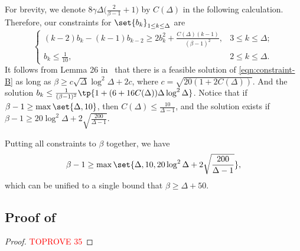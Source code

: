 \documentclass[a4paper,11pt]{article}
\begin{document}
For brevity, we denote ${8\gamma\Delta}\Big(\frac{2}{\beta-1} + 1\Big)$ by $C(\Delta)$ in the following calculation. Therefore, our constraints for $\set{b_k}_{1\leq k\leq \Delta}$ are
\begin{equation}
	\label{eqn:constraint-B}\tag{$\blacktriangle$}
	\begin{cases}
		(k-2) b_k - (k-1)b_{k-2} \ge 2b_k^2+\frac{C(\Delta)(k-1)}{(\beta-1)^2},& 3\le k\le \Delta; \\
		b_k \le \frac1{10}, & 2\le k\le \Delta.
	\end{cases}
\end{equation}
It follows from Lemma 26 in~\cite{WZZ24} that there is a feasible solution of \cref{eqn:constraint-B}
as long as $\beta\ge c\sqrt\Delta\log^2\Delta + 2c$, where $c = \sqrt{20(1+2C(\Delta))}$. And the solution $b_k \leq \frac{1}{(\beta-1)^2}\tp{1+(6+16 C(\Delta))\Delta \log^2 \Delta}$.
Notice that if $\beta - 1\ge \max\set{\Delta, 10}$, then $C(\Delta)\le \frac{10}{\Delta-1}$,
and the solution exists if $\beta - 1\ge 20\log^2\Delta+2\sqrt{\frac{200}{\Delta-1}}$.

Putting all constraints to $\beta$ together, we have
\[\beta-1\ge \max\set{\Delta, 10, 20\log^2\Delta+2\sqrt{\frac{200}{\Delta-1}}},\]
which can be unified to a single bound that $\beta\ge \Delta + 50$.

\subsection{Proof of }
\begin{proof}\textcolor{red}{TOPROVE 35}\end{proof}
 
\end{document}
